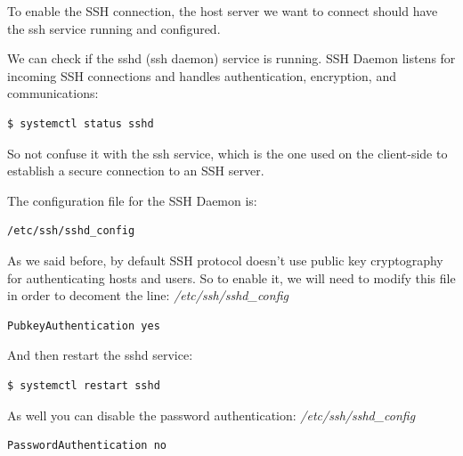 \documentclass{article}
\newenvironment{blocktemplateII}[1]{%
    \tcolorbox[beamer,%
    noparskip,breakable,
    colframe=Green,%
    colbacklower=LimeGreen!75!LightGreen,%
    title=#1]}%
    {\endtcolorbox}
\newenvironment{blocktemplateIII}[1]{%
    \tcolorbox[beamer,%
    noparskip,breakable,
    ,colframe=Red,%
    colbacklower=LimeGreen!75!LightGreen,%
    title=#1]}%
    {\endtcolorbox}
\newenvironment{codetemplate}[1][]{%
  \mybasecolorbox[#1]
  \itshape
}{%
  \endmybasecolorbox
}
\begin{document}
To enable the SSH connection, the host server we want to connect should have the ssh service running and configured. 

We can check if the sshd (ssh daemon) service is running. SSH Daemon listens for incoming SSH connections and handles authentication, encryption, and communications: 

\begin{codetemplate}{}
\begin{verbatim}
$ systemctl status sshd
\end{verbatim}
\end{codetemplate}

\begin{blocktemplateIII}{WARNING}
So not confuse it with the ssh service,  which is the one used on the client-side to establish a secure connection to an SSH server. 
\end{blocktemplateIII}

The configuration file for the SSH Daemon is:
\begin{codetemplate}{}
\begin{verbatim}
/etc/ssh/sshd_config
\end{verbatim}
\end{codetemplate}

As we said before, by default SSH protocol doesn't use public key cryptography for authenticating hosts and users. So to enable it, we will need to modify this file in order to decoment the line:
\begin{codetemplate}{/etc/ssh/sshd\_config}
\begin{verbatim}
PubkeyAuthentication yes
\end{verbatim}
\end{codetemplate}

And then restart the sshd service:
\begin{codetemplate}{}
\begin{verbatim}
$ systemctl restart sshd
\end{verbatim}
\end{codetemplate}

\begin{blocktemplateII}{NOTE}
As well you can disable the password authentication:
\begin{codetemplate}{/etc/ssh/sshd\_config}
\begin{verbatim}
PasswordAuthentication no
\end{verbatim}
\end{codetemplate}
\end{blocktemplateII}
\end{document}
